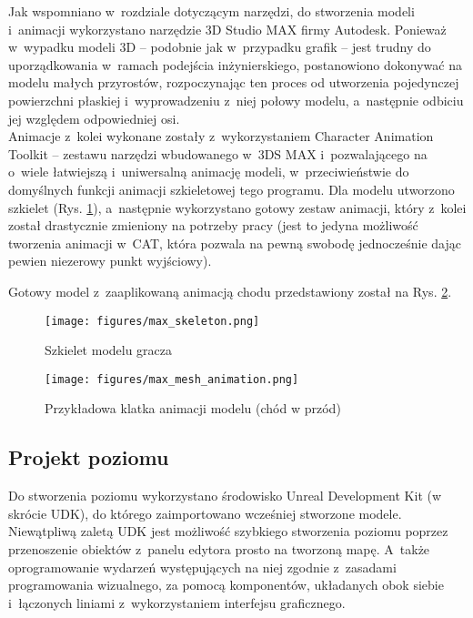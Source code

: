 Jak wspomniano w~rozdziale dotyczącym narzędzi, do stworzenia modeli i~animacji wykorzystano narzędzie 3D Studio MAX firmy Autodesk. Ponieważ w~wypadku modeli 3D -- podobnie jak w~przypadku grafik -- jest trudny do uporządkowania w~ramach podejścia inżynierskiego, postanowiono dokonywać na modelu małych przyrostów, rozpoczynając ten proces od utworzenia pojedynczej powierzchni płaskiej i~wyprowadzeniu z~niej połowy modelu, a~następnie odbiciu jej względem odpowiedniej osi.\\
Animacje z~kolei wykonane zostały z~wykorzystaniem Character Animation Toolkit -- zestawu narzędzi wbudowanego w~3DS MAX i~pozwalającego na o~wiele łatwiejszą i~uniwersalną animację modeli, w~przeciwieństwie do domyślnych funkcji animacji szkieletowej tego programu. Dla modelu utworzono szkielet (Rys. \ref{max_skeleton}), a~następnie wykorzystano gotowy zestaw animacji, który z~kolei został drastycznie zmieniony na potrzeby pracy (jest to jedyna możliwość tworzenia animacji w~CAT, która pozwala na pewną swobodę jednocześnie dając pewien niezerowy punkt wyjściowy).

Gotowy model z~zaaplikowaną animacją chodu przedstawiony został na Rys. \ref{max_animated}.

\begin{figure}
\begin{center}
\texttt{[image: figures/max\_skeleton.png]}
\caption{Szkielet modelu gracza}
\label{max_skeleton}
\end{center}
\end{figure}

\begin{figure}
\begin{center}
\texttt{[image: figures/max\_mesh\_animation.png]}
\caption{Przykładowa klatka animacji modelu (chód w przód)}
\label{max_animated}
\end{center}
\end{figure}

\subsection{Projekt poziomu}

Do stworzenia poziomu wykorzystano środowisko Unreal Development Kit (w skrócie UDK), do którego zaimportowano wcześniej stworzone modele. Niewątpliwą zaletą UDK jest możliwość szybkiego stworzenia poziomu poprzez przenoszenie obiektów z~panelu edytora prosto na tworzoną mapę. A~także oprogramowanie wydarzeń występujących na niej zgodnie z~zasadami programowania wizualnego, za pomocą komponentów, układanych obok siebie i~łączonych liniami z~wykorzystaniem interfejsu graficznego.

